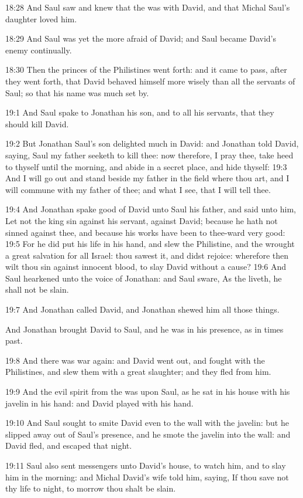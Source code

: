 18:28 And Saul saw and knew that the \LORD was with David, and that Michal Saul's daughter loved him.

18:29 And Saul was yet the more afraid of David; and Saul became David's enemy continually.

18:30 Then the princes of the Philistines went forth: and it came to pass, after they went forth, that David behaved himself more wisely than all the servants of Saul; so that his name was much set by.

19:1 And Saul spake to Jonathan his son, and to all his servants, that they should kill David.

19:2 But Jonathan Saul's son delighted much in David: and Jonathan told David, saying, Saul my father seeketh to kill thee: now therefore, I pray thee, take heed to thyself until the morning, and abide in a secret place, and hide thyself: 19:3 And I will go out and stand beside my father in the field where thou art, and I will commune with my father of thee; and what I see, that I will tell thee.

19:4 And Jonathan spake good of David unto Saul his father, and said unto him, Let not the king sin against his servant, against David; because he hath not sinned against thee, and because his works have been to thee-ward very good: 19:5 For he did put his life in his hand, and slew the Philistine, and the \LORD wrought a great salvation for all Israel: thou sawest it, and didst rejoice: wherefore then wilt thou sin against innocent blood, to slay David without a cause?  19:6 And Saul hearkened unto the voice of Jonathan: and Saul sware, As the \LORD liveth, he shall not be slain.

19:7 And Jonathan called David, and Jonathan shewed him all those things.

And Jonathan brought David to Saul, and he was in his presence, as in times past.

19:8 And there was war again: and David went out, and fought with the Philistines, and slew them with a great slaughter; and they fled from him.

19:9 And the evil spirit from the \LORD was upon Saul, as he sat in his house with his javelin in his hand: and David played with his hand.

19:10 And Saul sought to smite David even to the wall with the javelin: but he slipped away out of Saul's presence, and he smote the javelin into the wall: and David fled, and escaped that night.

19:11 Saul also sent messengers unto David's house, to watch him, and to slay him in the morning: and Michal David's wife told him, saying, If thou save not thy life to night, to morrow thou shalt be slain.

